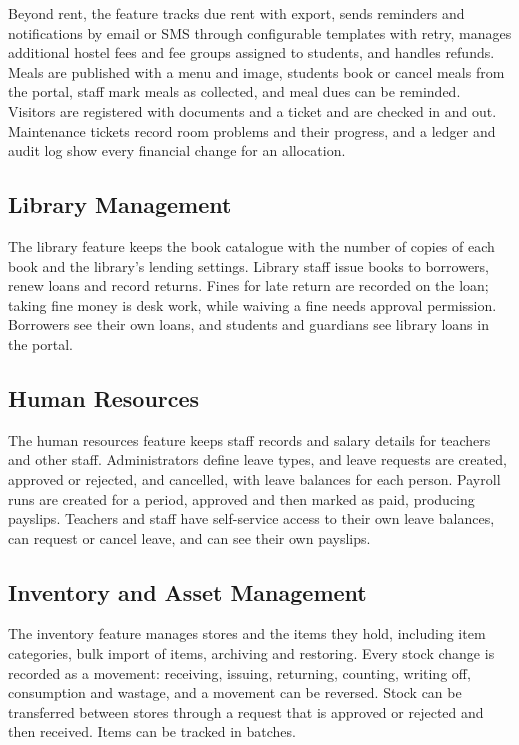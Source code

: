 Beyond rent, the feature tracks due rent with export, sends reminders and notifications by email or SMS through configurable templates with retry, manages additional hostel fees and fee groups assigned to students, and handles refunds. Meals are published with a menu and image, students book or cancel meals from the portal, staff mark meals as collected, and meal dues can be reminded. Visitors are registered with documents and a ticket and are checked in and out. Maintenance tickets record room problems and their progress, and a ledger and audit log show every financial change for an allocation.

\subsection{Library Management}
The library feature keeps the book catalogue with the number of copies of each book and the library's lending settings. Library staff issue books to borrowers, renew loans and record returns. Fines for late return are recorded on the loan; taking fine money is desk work, while waiving a fine needs approval permission. Borrowers see their own loans, and students and guardians see library loans in the portal.

\subsection{Human Resources}
The human resources feature keeps staff records and salary details for teachers and other staff. Administrators define leave types, and leave requests are created, approved or rejected, and cancelled, with leave balances for each person. Payroll runs are created for a period, approved and then marked as paid, producing payslips. Teachers and staff have self-service access to their own leave balances, can request or cancel leave, and can see their own payslips.

\subsection{Inventory and Asset Management}
The inventory feature manages stores and the items they hold, including item categories, bulk import of items, archiving and restoring. Every stock change is recorded as a movement: receiving, issuing, returning, counting, writing off, consumption and wastage, and a movement can be reversed. Stock can be transferred between stores through a request that is approved or rejected and then received. Items can be tracked in batches.

